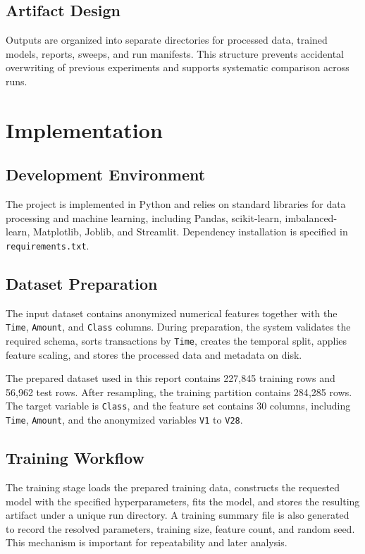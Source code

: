 \documentclass[12pt,a4paper]{report}
\begin{document}
\section{Artifact Design}
Outputs are organized into separate directories for processed data, trained models, reports, sweeps, and run manifests. This structure prevents accidental overwriting of previous experiments and supports systematic comparison across runs.

\chapter{Implementation}
\section{Development Environment}
The project is implemented in Python and relies on standard libraries for data processing and machine learning, including Pandas, scikit-learn, imbalanced-learn, Matplotlib, Joblib, and Streamlit. Dependency installation is specified in \texttt{requirements.txt}.

\section{Dataset Preparation}
The input dataset contains anonymized numerical features together with the \texttt{Time}, \texttt{Amount}, and \texttt{Class} columns. During preparation, the system validates the required schema, sorts transactions by \texttt{Time}, creates the temporal split, applies feature scaling, and stores the processed data and metadata on disk.

The prepared dataset used in this report contains 227{,}845 training rows and 56{,}962 test rows. After resampling, the training partition contains 284{,}285 rows. The target variable is \texttt{Class}, and the feature set contains 30 columns, including \texttt{Time}, \texttt{Amount}, and the anonymized variables \texttt{V1} to \texttt{V28}.

\section{Training Workflow}
The training stage loads the prepared training data, constructs the requested model with the specified hyperparameters, fits the model, and stores the resulting artifact under a unique run directory. A training summary file is also generated to record the resolved parameters, training size, feature count, and random seed. This mechanism is important for repeatability and later analysis.
\end{document}
